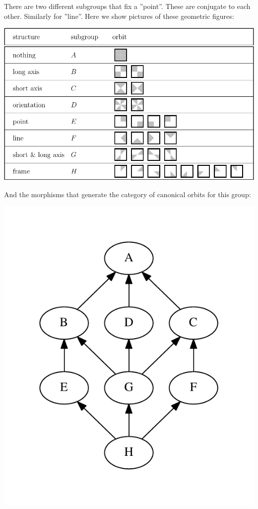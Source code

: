 \documentclass[11pt,oneside]{article}
\begin{document}
There are two different subgroups that fix a ''point''.
These are conjugate to each other.
Similarly for ''line''.
Here we show pictures of these geometric figures:

\begin{center}
\includegraphics[]{pic-square-structures.pdf} 
\end{center}

And the morphisms that generate the category of canonical orbits for this
group:
\begin{center}
\includegraphics[width=0.4\columnwidth]{subgroups_d8.pdf} 
\end{center}
\end{document}

